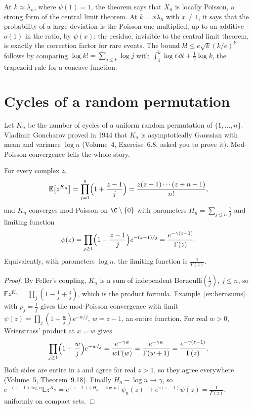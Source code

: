 At $k\approx\lambda_n$, where $\psi(1)=1$, the theorem says that $X_n$ is locally Poisson, a strong form of the central limit theorem. At $k=x\lambda_n$ with $x\neq1$, it says that the probability of a large deviation is the Poisson one
multiplied, up to an additive $o(1)$ in the ratio, by $\psi(x)$: the residue, invisible to the central limit theorem, is exactly the correction factor for rare events. The bound $k!\le e\sqrt k(k/e)^k$ follows by comparing $\log k!=\sum_{j\le k}\log j$ with
$\int_1^k\log t\,\dd t+\frac12\log k$, the trapezoid rule for a concave function.

\section{Cycles of a random permutation}

Let $K_n$ be the number of cycles of a uniform random permutation of $\{1,\dots,n\}$. Vladimir Goncharov proved in 1944 that $K_n$ is asymptotically Gaussian with mean and variance $\log n$ (Volume~4, Exercise~6.8, asked you to prove it).
Mod-Poisson convergence tells the whole story.

\begin{theorem}\label{thm:cyclesmod}
For every complex $z$,
\[
\mathbb E\bigl[z^{K_n}\bigr]=\prod_{j=1}^n\Bigl(1+\frac{z-1}j\Bigr)=\frac{z(z+1)\cdots(z+n-1)}{n!},
\]
and $K_n$ converges mod-Poisson on $\C\setminus\{0\}$ with parameters $H_n=\sum_{j\le n}\frac1j$ and limiting function
\[
\psi(z)=\prod_{j\ge1}\Bigl(1+\frac{z-1}j\Bigr)e^{-(z-1)/j}=\frac{e^{-\gamma(z-1)}}{\Gamma(z)}.
\]
Equivalently, with parameters $\log n$, the limiting function is $\frac1{\Gamma(z)}$.
\end{theorem}
\begin{proof}
By Feller's coupling, $K_n$ is a sum of independent Bernoulli$(\frac1j)$, $j\le n$, so $\mathbb Ez^{K_n}=\prod_j(1-\frac1j+\frac zj)$, which is the product formula. Example~\ref{ex:bernsums} with $p_j=\frac1j$ gives the mod-Poisson
convergence with limit $\psi(z)=\prod_j(1+\frac wj)e^{-w/j}$, $w=z-1$, an entire function. For real $w>0$, Weierstrass' product at $x=w$ gives
\[
\prod_{j\ge1}\Bigl(1+\frac wj\Bigr)e^{-w/j}=\frac{e^{-\gamma w}}{w\Gamma(w)}=\frac{e^{-\gamma w}}{\Gamma(w+1)}=\frac{e^{-\gamma(z-1)}}{\Gamma(z)}.
\]
Both sides are entire in $z$ and agree for real $z>1$, so they agree everywhere (Volume~5, Theorem~9.18). Finally $H_n-\log n\to\gamma$, so $e^{-(z-1)\log n}\mathbb Ez^{K_n}=e^{(z-1)(H_n-\log n)}\psi_n(z)\to e^{\gamma(z-1)}\psi(z)=\frac1{\Gamma(z)}$, uniformly on compact sets.
\end{proof}

